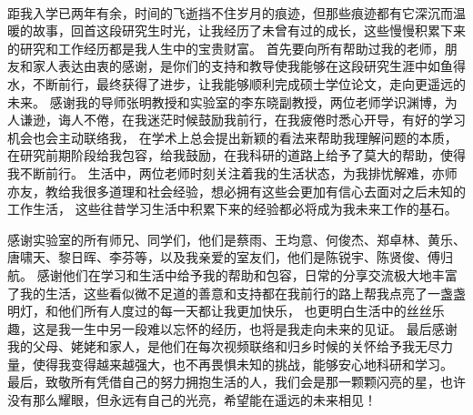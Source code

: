 \cleardoublepage
\ 
\vspace{-6mm}
\vspace{3mm}

距我入学已两年有余，时间的飞逝挡不住岁月的痕迹，但那些痕迹都有它深沉而温暖的故事，回首这段研究生时光，让我经历了未曾有过的成长，这些慢慢积累下来的研究和工作经历都是我人生中的宝贵财富。
首先要向所有帮助过我的老师，朋友和家人表达由衷的感谢，是你们的支持和教导使我能够在这段研究生涯中如鱼得水，不断前行，最终获得了进步，让我能够顺利完成硕士学位论文，走向更遥远的未来。
感谢我的导师张明教授和实验室的李东晓副教授，两位老师学识渊博，为人谦逊，诲人不倦，在我迷茫时候鼓励我前行，在我疲倦时悉心开导，有好的学习机会也会主动联络我，
在学术上总会提出新颖的看法来帮助我理解问题的本质，在研究前期阶段给我包容，给我鼓励，在我科研的道路上给予了莫大的帮助，使得我不断前行。
生活中，两位老师时刻关注着我的生活状态，为我排忧解难，亦师亦友，教给我很多道理和社会经验，想必拥有这些会更加有信心去面对之后未知的工作生活，
这些往昔学习生活中积累下来的经验都必将成为我未来工作的基石。

感谢实验室的所有师兄、同学们，他们是蔡雨、王均意、何俊杰、郑卓林、黄乐、唐啸天、黎日晖、李芬等，以及我亲爱的室友们，他们是陈锐宇、陈贤俊、傅归航。
感谢他们在学习和生活中给予我的帮助和包容，日常的分享交流极大地丰富了我的生活，这些看似微不足道的善意和支持都在我前行的路上帮我点亮了一盏盏明灯，和他们所有人度过的每一天都让我更加快乐，
也更明白生活中的丝丝乐趣，这是我一生中另一段难以忘怀的经历，也将是我走向未来的见证。
最后感谢我的父母、姥姥和家人，是他们在每次视频联络和归乡时候的关怀给予我无尽力量，使得我变得越来越强大，也不再畏惧未知的挑战，能够安心地科研和学习。
最后，致敬所有凭借自己的努力拥抱生活的人，我们会是那一颗颗闪亮的星，也许没有那么耀眼，但永远有自己的光亮，希望能在遥远的未来相见！

\




